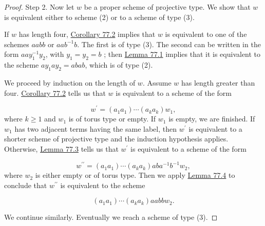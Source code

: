 \begin{proof}
Step 2. Now let \(w\) be a proper scheme of projective type. We show that \(w\) is equivalent either to scheme (2) or to a scheme of type (3).

If \(w\) has length four, \hyperref[cor:77.2]{Corollary 77.2} implies that \(w\) is equivalent to one of the schemes \({aabb}\) or \({aa}b^{-1}b\). The first is of type (3). The second can be written in the form \({aa}y_1^{-1}y_{2}\), with \(y_{1} = y_{2} = b\) ; then \hyperref[lem:77.1]{Lemma 77.1} implies that it is equivalent to the scheme \(ay_{1}ay_{2} = {abab}\), which is of type (2).

We proceed by induction on the length of \(w\). Assume \(w\) has length greater than four. \hyperref[cor:77.2]{Corollary 77.2} tells us that \(w\) is equivalent to a scheme of the form

\[
w^{\prime } = ( {a_{1}a_{1}}) \cdots ( {a_{k}a_{k}}) w_{1},
\]
where \(k \geq 1\) and \(w_{1}\) is of torus type or empty. If \(w_{1}\) is empty, we are finished. If \(w_{1}\) has two adjacent terms having the same label, then \(w^{\prime }\) is equivalent to a shorter scheme of projective type and the induction hypothesis applies. Otherwise, \hyperref[lem:77.3]{Lemma 77.3} tells us that \(w^{\prime }\) is equivalent to a scheme of the form

\[
w^{\prime \prime } = ( {a_{1}a_{1}}) \cdots ( {a_{k}a_{k}}) {ab}a^{-1}b^{-1}w_{2},
\]
where \(w_{2}\) is either empty or of torus type. Then we apply \hyperref[lem:77.4]{Lemma 77.4} to conclude that \(w^{\prime \prime }\) is equivalent to the scheme

\[
( {a_{1}a_{1}}) \cdots ( {a_{k}a_{k}}) {aabb}w_{2}.
\]

We continue similarly. Eventually we reach a scheme of type (3).
\end{proof}
